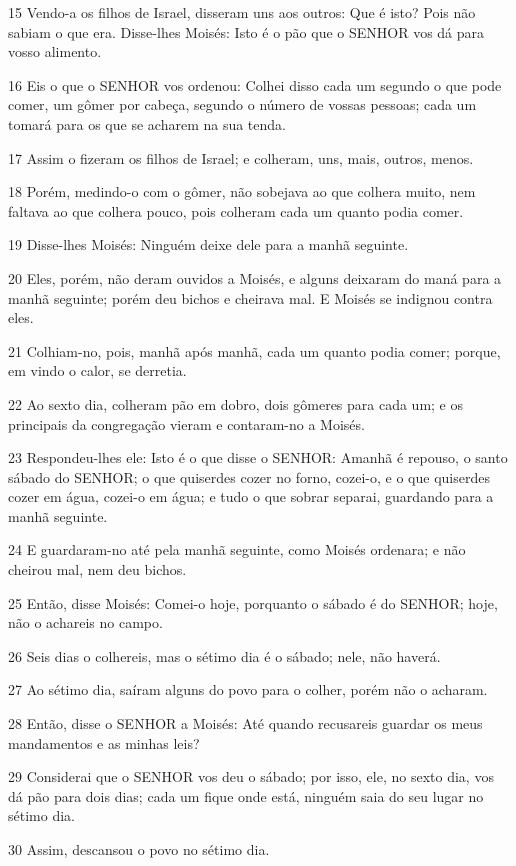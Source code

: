\par 15 Vendo-a os filhos de Israel, disseram uns aos outros: Que é isto? Pois não sabiam o que era. Disse-lhes Moisés: Isto é o pão que o SENHOR vos dá para vosso alimento.
\par 16 Eis o que o SENHOR vos ordenou: Colhei disso cada um segundo o que pode comer, um gômer por cabeça, segundo o número de vossas pessoas; cada um tomará para os que se acharem na sua tenda.
\par 17 Assim o fizeram os filhos de Israel; e colheram, uns, mais, outros, menos.
\par 18 Porém, medindo-o com o gômer, não sobejava ao que colhera muito, nem faltava ao que colhera pouco, pois colheram cada um quanto podia comer.
\par 19 Disse-lhes Moisés: Ninguém deixe dele para a manhã seguinte.
\par 20 Eles, porém, não deram ouvidos a Moisés, e alguns deixaram do maná para a manhã seguinte; porém deu bichos e cheirava mal. E Moisés se indignou contra eles.
\par 21 Colhiam-no, pois, manhã após manhã, cada um quanto podia comer; porque, em vindo o calor, se derretia.
\par 22 Ao sexto dia, colheram pão em dobro, dois gômeres para cada um; e os principais da congregação vieram e contaram-no a Moisés.
\par 23 Respondeu-lhes ele: Isto é o que disse o SENHOR: Amanhã é repouso, o santo sábado do SENHOR; o que quiserdes cozer no forno, cozei-o, e o que quiserdes cozer em água, cozei-o em água; e tudo o que sobrar separai, guardando para a manhã seguinte.
\par 24 E guardaram-no até pela manhã seguinte, como Moisés ordenara; e não cheirou mal, nem deu bichos.
\par 25 Então, disse Moisés: Comei-o hoje, porquanto o sábado é do SENHOR; hoje, não o achareis no campo.
\par 26 Seis dias o colhereis, mas o sétimo dia é o sábado; nele, não haverá.
\par 27 Ao sétimo dia, saíram alguns do povo para o colher, porém não o acharam.
\par 28 Então, disse o SENHOR a Moisés: Até quando recusareis guardar os meus mandamentos e as minhas leis?
\par 29 Considerai que o SENHOR vos deu o sábado; por isso, ele, no sexto dia, vos dá pão para dois dias; cada um fique onde está, ninguém saia do seu lugar no sétimo dia.
\par 30 Assim, descansou o povo no sétimo dia.
